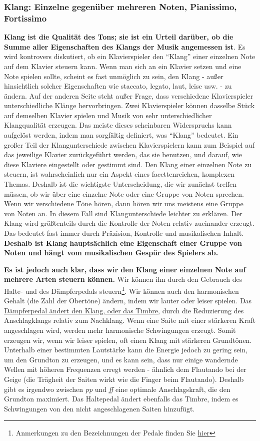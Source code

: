 \subsubsection{Klang: Einzelne gegenüber mehreren Noten, Pianissimo, Fortissimo}
\label{c1iii1a2}

\textbf{Klang ist die Qualität des Tons; sie ist ein Urteil darüber, ob die Summe aller Eigenschaften des Klangs der Musik angemessen ist}.
Es wird kontrovers diskutiert, ob ein Klavierspieler den \enquote{Klang} einer einzelnen Note auf dem Klavier steuern kann.
Wenn man sich an ein Klavier setzen und eine Note spielen sollte, scheint es fast unmöglich zu sein, den Klang - außer hinsichtlich solcher Eigenschaften wie staccato, legato, laut, leise usw. - zu ändern.
Auf der anderen Seite steht außer Frage, dass verschiedene Klavierspieler unterschiedliche Klänge hervorbringen.
Zwei Klavierspieler können dasselbe Stück auf demselben Klavier spielen und Musik von sehr unterschiedlicher Klangqualität erzeugen.
Das meiste dieses scheinbaren Widerspruchs kann aufgelöst werden, indem man sorgfältig definiert, was \enquote{Klang} bedeutet.
Ein großer Teil der Klangunterschiede zwischen Klavierspielern kann zum Beispiel auf das jeweilige Klavier zurückgeführt werden, das sie benutzen, und darauf, wie diese Klaviere eingestellt oder gestimmt sind.
Den Klang einer einzelnen Note zu steuern, ist wahrscheinlich nur ein Aspekt eines facettenreichen, komplexen Themas.
Deshalb ist die wichtigste Unterscheidung, die wir zunächst treffen müssen, ob wir über eine einzelne Note oder eine Gruppe von Noten sprechen.
Wenn wir verschiedene Töne hören, dann hören wir uns meistens eine Gruppe von Noten an.
In diesem Fall sind Klangunterschiede leichter zu erklären.
Der Klang wird größtenteils durch die Kontrolle der Noten relativ zueinander erzeugt.
Das bedeutet fast immer durch Präzision, Kontrolle und musikalischen Inhalt.
\textbf{Deshalb ist Klang hauptsächlich eine Eigenschaft einer Gruppe von Noten und hängt vom musikalischen Gespür des Spielers ab.}

\textbf{Es ist jedoch auch klar, dass wir den Klang einer einzelnen Note auf mehrere Arten steuern können.}
Wir können ihn durch den Gebrauch des Halte- und des Dämpferpedals steuern\footnote{Anmerkungen zu den Bezeichnungen der Pedale finden Sie \hyperref[Pedale]{hier}}.
Wir können auch den harmonischen Gehalt (die Zahl der Obertöne) ändern, indem wir lauter oder leiser spielen.
Das \hyperref[c1ii24]{Dämpferpedal ändert den Klang, oder das Timbre}, durch die Reduzierung des Anschlagklangs relativ zum Nachklang.
Wenn eine Saite mit einer stärkeren Kraft angeschlagen wird, werden mehr harmonische Schwingungen erzeugt.
Somit erzeugen wir, wenn wir leiser spielen, oft einen Klang mit stärkeren Grundtönen.
Unterhalb einer bestimmten Lautstärke kann die Energie jedoch zu gering sein, um den Grundton zu erzeugen, und es kann sein, dass nur einige wandernde Wellen mit höheren Frequenzen erregt werden - ähnlich dem Flautando bei der Geige (die Trägheit der Saiten wirkt wie die Finger beim Flautando).
Deshalb gibt es irgendwo zwischen \textit{pp} und \textit{ff} eine optimale Anschlagskraft, die den Grundton maximiert.
Das Haltepedal ändert ebenfalls das Timbre, indem es Schwingungen von den nicht angeschlagenen Saiten hinzufügt.


